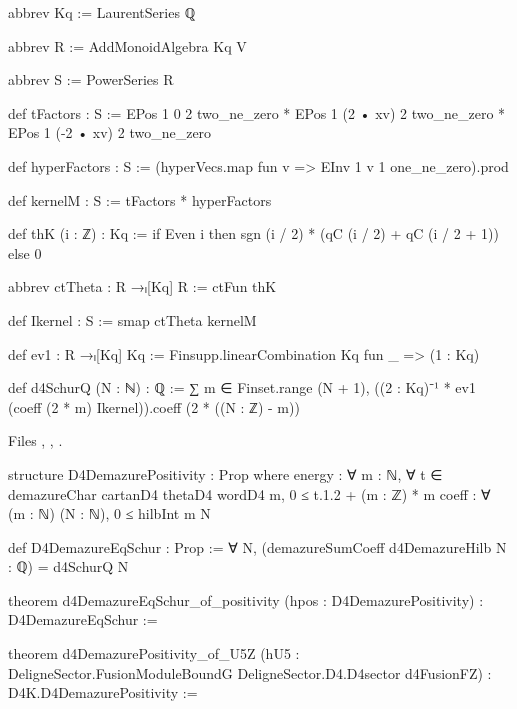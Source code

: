 \begin{leancode}
abbrev Kq := LaurentSeries ℚ

abbrev R := AddMonoidAlgebra Kq V

abbrev S := PowerSeries R

def tFactors : S :=
  EPos 1 0 2 two_ne_zero * EPos 1 (2 • xv) 2 two_ne_zero * EPos 1 (-2 • xv) 2 two_ne_zero

def hyperFactors : S := (hyperVecs.map fun v => EInv 1 v 1 one_ne_zero).prod

def kernelM : S := tFactors * hyperFactors

def thK (i : ℤ) : Kq := if Even i then sgn (i / 2) * (qC (i / 2) + qC (i / 2 + 1)) else 0

abbrev ctTheta : R →ₗ[Kq] R := ctFun thK

def Ikernel : S := smap ctTheta kernelM

def ev1 : R →ₗ[Kq] Kq := Finsupp.linearCombination Kq fun _ => (1 : Kq)

def d4SchurQ (N : ℕ) : ℚ :=
  ∑ m ∈ Finset.range (N + 1), ((2 : Kq)⁻¹ * ev1 (coeff (2 * m) Ikernel)).coeff (2 * ((N : ℤ) - m))
\end{leancode}
\noindent Files , ,
.
\begin{leancode}
structure D4DemazurePositivity : Prop where
  energy : ∀ m : ℕ, ∀ t ∈ demazureChar cartanD4 thetaD4 wordD4 m, 0 ≤ t.1.2 + (m : ℤ) * m
  coeff : ∀ (m : ℕ) (N : ℕ), 0 ≤ hilbInt m N

def D4DemazureEqSchur : Prop := ∀ N, (demazureSumCoeff d4DemazureHilb N : ℚ) = d4SchurQ N

theorem d4DemazureEqSchur_of_positivity (hpos : D4DemazurePositivity) : D4DemazureEqSchur :=

theorem d4DemazurePositivity_of_U5Z
    (hU5 : DeligneSector.FusionModuleBoundG DeligneSector.D4.D4sector d4FusionFZ) :
    D4K.D4DemazurePositivity :=
\end{leancode}

